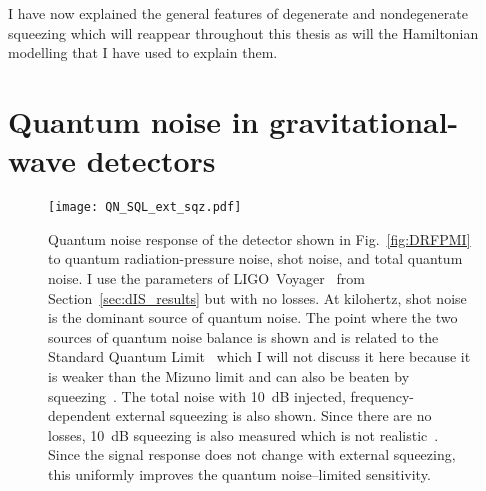 I have now explained the general features of degenerate and nondegenerate squeezing which will reappear throughout this thesis as will the Hamiltonian modelling that I have used to explain them.


\section{Quantum noise in gravitational-wave detectors}
\label{sec:qnoise_GW_IFO}


\begin{figure}
	\centering
	\texttt{[image: QN\_SQL\_ext\_sqz.pdf]}
	\caption{ Quantum noise response of the detector shown in Fig.~\ref{fig:DRFPMI} to quantum radiation-pressure noise, shot noise, and total quantum noise. I use the parameters of LIGO~Voyager~\cite{} from Section~\ref{sec:dIS_results} but with no losses. At kilohertz, shot noise is the dominant source of quantum noise. The point where the two sources of quantum noise balance is shown and is related to the Standard Quantum Limit~\cite{} which I will not discuss it here because it is weaker than the Mizuno limit and can also be beaten by squeezing~\cite{}.
	The total noise with 10~dB injected, frequency-dependent external squeezing is also shown. Since there are no losses, 10~dB squeezing is also measured which is not realistic~\cite{}. Since the signal response does not change with external squeezing, this uniformly improves the quantum noise--limited sensitivity.	
	} %
	\label{fig:simplifed_QN_response_conventional}
\end{figure}


